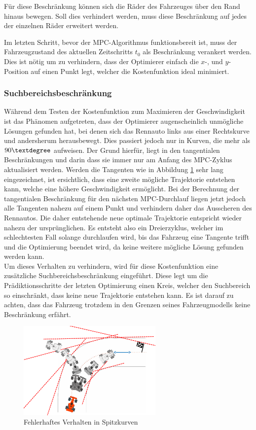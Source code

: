 \documentclass{like}
\begin{document}
Für diese Beschränkung können sich die Räder des Fahrzeuges über den Rand hinaus bewegen. Soll dies verhindert werden, muss diese Beschränkung auf jedes der einzelnen Räder erweitert werden.

Im letzten Schritt, bevor der \ac{MPC}-Algorithmus funktionsbereit ist, muss der Fahrzeugzustand des aktuellen Zeitschritts $t_0$ als Beschränkung verankert werden.  Dies ist nötig um zu verhindern, dass der Optimierer einfach die \(x\)-, und \(y\)-Position auf einen Punkt legt, welcher die Kostenfunktion ideal minimiert. 

\subsubsection*{Suchbereichsbeschränkung}
Während dem Testen der Kostenfunktion zum Maximieren der Geschwindigkeit ist das Phänomen aufgetreten, dass der Optimierer augenscheinlich unmögliche Lösungen gefunden hat, bei denen sich das Rennauto links aus einer Rechtskurve und andersherum herausbewegt. Dies passiert jedoch nur in Kurven, die mehr als $90\textdegree$ aufweisen. Der Grund hierfür, liegt in den tangentialen Beschränkungen und darin dass sie immer nur am Anfang des MPC-Zyklus aktualisiert werden. Werden die Tangenten wie in Abbildung \ref{fig:curveAnomaly} sehr lang eingezeichnet, ist ersichtlich, dass eine zweite mögliche Trajektorie entstehen kann, welche eine höhere Geschwindigkeit ermöglicht. Bei der Berechnung der tangentialen Beschränkung für den nächsten \ac{MPC}-Durchlauf liegen jetzt jedoch alle Tangenten nahezu auf einem Punkt und verhindern daher das Ausscheren des Rennautos. Die daher entstehende neue optimale Trajektorie entspricht wieder nahezu der ursprünglichen. Es entsteht also ein Dreierzyklus, welcher im schlechtesten Fall solange durchlaufen wird, bis das Fahrzeug eine Tangente trifft und die Optimierung beendet wird, da keine weitere mögliche Lösung gefunden werden kann.\\
Um dieses Verhalten zu verhindern, wird für diese Kostenfunktion eine zusätzliche Suchbereichsbeschränkung eingeführt. Diese legt um die Prädiktionsschritte der letzten Optimierung einen Kreis, welcher den Suchbereich so einschränkt, dass keine neue Trajektorie entstehen kann. Es ist darauf zu achten, dass das Fahrzeug trotzdem in den Grenzen seines Fahrzeugmodells keine Beschränkung erfährt. 


\begin{figure}[ht!]
	\centering
	\includegraphics[width=200pt]{Abbildungen/curveAnomaly.png}
	\caption{Fehlerhaftes Verhalten in Spitzkurven}
	\label{fig:curveAnomaly}
\end{figure}
\end{document}

